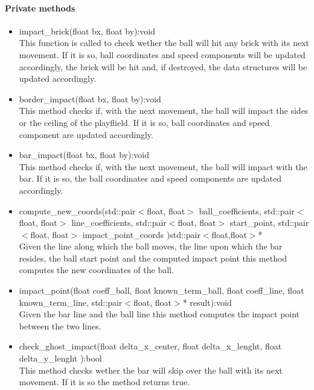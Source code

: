 \documentclass[]{article}
\begin{document}
	\paragraph{Private methods}
	\begin{itemize}
	\item impact\_brick(float bx, float by):void\\ This function is called to check wether the ball will hit any brick with its next movement. If it is so, ball coordinates and speed components will be updated accordingly, the brick will be hit and, if destroyed, the data structures will be updated accordingly.
	\item border\_impact(float bx, float by):void \\This method checks if, with the next movement, the ball will impact the sides or the ceiling of the playflield. If it is so, ball coordinates and speed component are updated accordingly.
	\item bar\_impact(float bx, float by):void \\This method checks if, with the next movement, the ball will impact with the bar. If it is so, the ball coordinates and speed components are updated accordingly.
	\item compute\_new\_coords(std::pair$<$float, float$>$ ball\_coefficients, std::pair$<$float, float$>$ line\_coefficients, std::pair$<$float, float$>$ start\_point, std::pair$<$float, float$>$ impact\_point\_coords )std::pair$<$float,float$>$*\\Given the line along which the ball moves, the line upon which the bar resides, the ball start point and the computed impact point this method computes the new coordinates of the ball.
	\item impact\_point(float coeff\_ball, float known\_term\_ball, float coeff\_line, float known\_term\_line, std::pair$<$float, float$>$* result):void \\Given the bar line and the ball line this method computes the impact point between the two lines.
	\item check\_ghost\_impact(float delta\_x\_center, float  delta\_x\_lenght, float delta\_y\_lenght ):bool \\This method checks wether the bar will skip over the ball with its next movement. If it is so the method returns true.
	\end{itemize}
\end{document}
